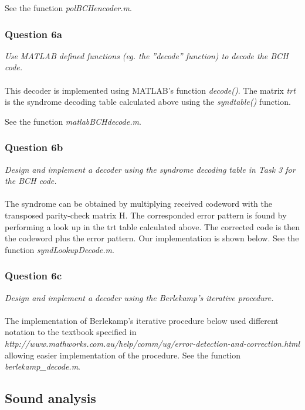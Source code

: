 \documentclass[a4paper]{article}
\begin{document}
See the function \textit{polBCHencoder.m}.

\subsubsection{Question 6a} \textit{Use MATLAB defined functions (eg. the ”decode” function) to decode the BCH code.}\\
\\
This decoder is implemented using MATLAB’s function \textit{decode()}. The matrix \textit{trt} is the syndrome decoding table calculated above using the \textit{syndtable()} function.

See the function \textit{matlabBCHdecode.m}.

\subsubsection{Question 6b} \textit{Design and implement a decoder using the syndrome decoding table in Task 3 for the BCH code.}\\
\\
The syndrome can be obtained by multiplying received codeword with the transposed parity-check matrix H. The corresponded error pattern is found by performing a look up in the trt table calculated above. The corrected code is then the codeword plus the error pattern. Our implementation is shown below. See the function \textit{syndLookupDecode.m}.

\subsubsection{Question 6c} \textit{Design and implement a decoder using the Berlekamp’s iterative procedure.}\\
\\
The implementation of Berlekamp's iterative procedure below used different notation to the textbook specified in \textit{http://www.mathworks.com.au/help/comm/ug/error-detection-and-correction.html} allowing easier implementation of the procedure. See the function \textit{berlekamp\_decode.m}.

\subsection{Sound analysis}
\end{document}
